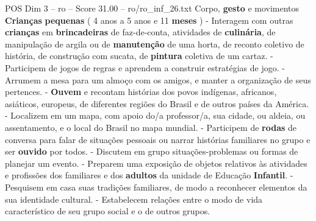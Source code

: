 \begin{textsample}{POS Dim 3 – ro – Score 31.00 – ro/ro\_inf\_26.txt}  \label{ex:f3_pos_134}
Corpo, \textbf{gesto} e movimentos \textbf{Crianças} \textbf{pequenas} ( 4 anos a 5 anos e 11 \textbf{meses} ) - Interagem com outras \textbf{crianças} em \textbf{brincadeiras} de faz-de-conta, atividades de \textbf{culinária}, de manipulação de argila ou de \textbf{manutenção} de uma horta, de reconto coletivo de história, de construção com sucata, de \textbf{pintura} coletiva de um cartaz. - Participem de jogos de regras e aprendem a construir estratégias de jogo. - Arrumem a mesa para um almoço com os amigos, e manter a organização de seus pertences. - \textbf{Ouvem} e recontam histórias dos povos indígenas, africanos, asiáticos, europeus, de diferentes regiões do Brasil e de outros países da América. - Localizem em um mapa, com apoio do/a professor/a, sua cidade, ou aldeia, ou assentamento, e o local do Brasil no mapa mundial. - Participem de \textbf{rodas} de conversa para falar de situações pessoais ou narrar histórias familiares no grupo e ser \textbf{ouvido} por todos. - Discutem em grupo situações-problemas ou formas de planejar um evento. - Preparem uma exposição de objetos relativos às atividades e profissões dos familiares e dos \textbf{adultos} da unidade de Educação \textbf{Infantil}. - Pesquisem em casa suas tradições familiares, de modo a reconhecer elementos da sua identidade cultural. - Estabelecem relações entre o modo de vida característico de seu grupo social e o de outros grupos.

\end{textsample}
